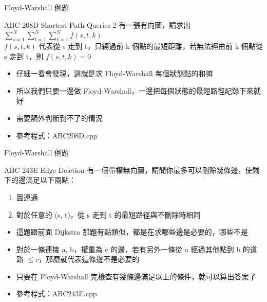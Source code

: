 \documentclass[aspectratio=169]{beamer}
\begin{document}
    \begin{frame}{Floyd-Warshall 例題}
        \begin{block}{ABC 208D Shortest Path Queries 2}
            有一張有向圖，請求出 $\displaystyle\sum_{s=1}^{N}\sum_{t=1}^{N}\sum_{k=1}^{N} f(s, t, k)$\\
            $f(s, t, k)$ 代表從 s 走到 t，只經過前 k 個點的最短距離，若無法經由前 k 個點從 s 走到 t，則 $f(s, t, k) = 0$
        \end{block}

        \begin{itemize}
            \item<2-> 仔細一看會發現，這就是求 Floyd-Warshall 每個狀態點的和嘛
            \item<3-> 所以我們只要一邊做 Floyd-Warshall，一邊把每個狀態的最短路徑記錄下來就好
            \item<4-> 需要額外判斷到不了的情況
            \item<4-> 參考程式：ABC208D.cpp
        \end{itemize}
    \end{frame}

    \begin{frame}{Floyd-Warshall 例題}
        \begin{block}{ABC 243E Edge Deletion}
            有一個帶權無向圖，請問你最多可以刪除幾條邊，使剩下的邊滿足以下兩點：
            \begin{enumerate}
                \item 圖連通
                \item 對於任意的 (s, t)，從 s 走到 t 的最短路徑與不刪除時相同
            \end{enumerate}
        \end{block}

        \begin{itemize}
            \item<2-> 這題跟前面 Dijkstra 那題有點類似，都是在求哪些邊是必要的，哪些不是
            \item<3-> 對於一條連接 a, b，權重為 c 的邊，若有另外一條從 a 經過其他點到 b 的道路 $\le c$，那麼就代表這條邊不是必要的
            \item<4-> 只要在 Floyd-Warshall 完檢查有幾條邊滿足以上的條件，就可以算出答案了
            \item<4-> 參考程式：ABC243E.cpp
        \end{itemize}
    \end{frame}
\end{document}
